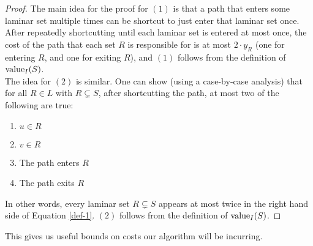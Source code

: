 \begin{proof}
	The main idea for the proof for $(1)$ is that a path that enters some laminar set multiple times can be shortcut to just enter that laminar set once. After repeatedly shortcutting until each laminar set is entered at most once, the cost of the path that each set $R$ is responsible for is at most $2\cdot y_R$ (one for entering $R$, and one for exiting $R$), and $(1)$ follows from the definition of $\textup{value}_I(S)$.\vspace{2mm}
	\\The idea for $(2)$ is similar. One can show (using a case-by-case analysis) that for all $R\in L$ with $R\subsetneq S$, after shortcutting the path, at most two of the following are true:
	\begin{enumerate}
		\item $u\in R$
		\item $v\in R$
		\item The path enters $R$
		\item The path exits $R$
	\end{enumerate}
	In other words, every laminar set $R\subsetneq S$ appears at most twice in the right hand side of Equation \ref{def-1}. $(2)$ follows from the definition of $\textup{value}_I(S)$.
\end{proof}\vspace{2mm}
This gives us useful bounds on costs our algorithm will be incurring.

